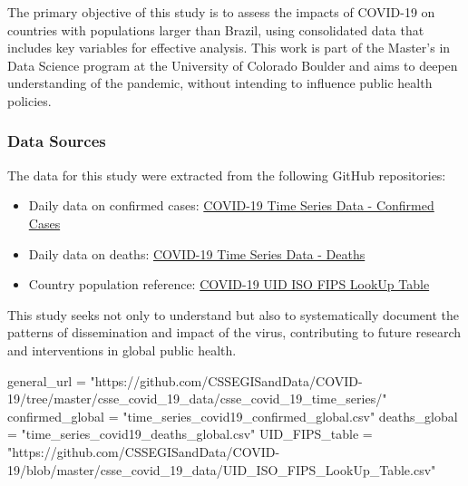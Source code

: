 \documentclass[
]{article}
\newenvironment{Shaded}{\begin{snugshade}}{\end{snugshade}}
\newcommand{\NormalTok}[1]{#1}
\newcommand{\OtherTok}[1]{\textcolor[rgb]{0.56,0.35,0.01}{#1}}
\newcommand{\StringTok}[1]{\textcolor[rgb]{0.31,0.60,0.02}{#1}}
\begin{document}
The primary objective of this study is to assess the impacts of COVID-19
on countries with populations larger than Brazil, using consolidated
data that includes key variables for effective analysis. This work is
part of the Master's in Data Science program at the University of
Colorado Boulder and aims to deepen understanding of the pandemic,
without intending to influence public health policies.

\subsubsection{Data Sources}\label{data-sources}

The data for this study were extracted from the following GitHub
repositories:

\begin{itemize}
\item
  Daily data on confirmed cases:
  \href{https://github.com/CSSEGISandData/COVID-19/blob/master/csse_covid_19_data/csse_covid_19_time_series/time_series_covid19_confirmed_global.csv}{COVID-19
  Time Series Data - Confirmed Cases}
\item
  Daily data on deaths:
  \href{https://github.com/CSSEGISandData/COVID-19/blob/master/csse_covid_19_data/csse_covid_19_time_series/time_series_covid19_deaths_global.csv}{COVID-19
  Time Series Data - Deaths}
\item
  Country population reference:
  \href{https://github.com/CSSEGISandData/COVID-19/blob/master/csse_covid_19_data/UID_ISO_FIPS_LookUp_Table.csv}{COVID-19
  UID ISO FIPS LookUp Table}
\end{itemize}

This study seeks not only to understand but also to systematically
document the patterns of dissemination and impact of the virus,
contributing to future research and interventions in global public
health.

\begin{Shaded}
\begin{Highlighting}[]
\NormalTok{general\_url }\OtherTok{=} \StringTok{"https://github.com/CSSEGISandData/COVID{-}19/tree/master/csse\_covid\_19\_data/csse\_covid\_19\_time\_series/"}
\NormalTok{confirmed\_global }\OtherTok{=} \StringTok{"time\_series\_covid19\_confirmed\_global.csv"}
\NormalTok{deaths\_global   }\OtherTok{=} \StringTok{"time\_series\_covid19\_deaths\_global.csv"}
\NormalTok{UID\_FIPS\_table }\OtherTok{=} \StringTok{"https://github.com/CSSEGISandData/COVID{-}19/blob/master/csse\_covid\_19\_data/UID\_ISO\_FIPS\_LookUp\_Table.csv"}
\end{Highlighting}
\end{Shaded}
\end{document}
